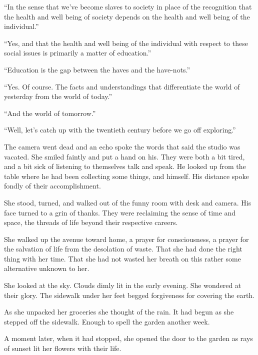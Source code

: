 ``In the sense that we've become slaves to society in place of the
recognition that the health and well being of society depends on the
health and well being of the individual.''

``Yes, and that the health and well being of the individual with
respect to these social issues is primarily a matter of education.''

``Education is the gap between the haves and the have-nots.''

``Yes.  Of course.  The facts and understandings that differentiate
the world of yesterday from the world of today.''

``And the world of tomorrow.''

``Well, let's catch up with the twentieth century before we go off
exploring.''




\vfill
\break


The camera went dead and an echo spoke the words that said the studio
was vacated.  She smiled faintly and put a hand on his.  They were
both a bit tired, and a bit sick of listening to themselves talk and
speak.  He looked up from the table where he had been collecting some
things, and himself.  His distance spoke fondly of their
accomplishment.

She stood, turned, and walked out of the funny room with desk and
camera.  His face turned to a grin of thanks.  They were reclaiming
the sense of time and space, the threads of life beyond their
respective careers.


\vfill
\break


She walked up the avenue toward home, a prayer for consciousness, a
prayer for the salvation of life from the desolation of waste.  That
she had done the right thing with her time.  That she had not wasted
her breath on this rather some alternative unknown to her.

She looked at the sky.  Clouds dimly lit in the early evening.  She
wondered at their glory.  The sidewalk under her feet begged
forgiveness for covering the earth.


\vfill
\break


As she unpacked her groceries she thought of the rain.  It had begun
as she stepped off the sidewalk.  Enough to spell the garden another
week.  

A moment later, when it had stopped, she opened the door to the garden
as rays of sunset lit her flowers with their life.


\vfill
\bye
